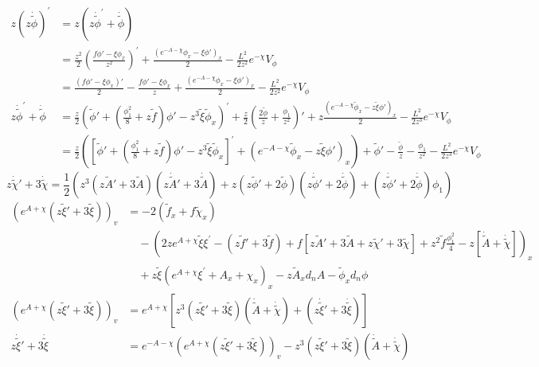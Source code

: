 \documentclass[12pt,a4paper]{ctexart}
\numberwithin{equation}{section}
\begin{document}
\begin{equation}
    \begin{aligned}
        z(z\dot{\tilde{\phi}})^{\prime}&=z(z\dot{\tilde{\phi}}^{\prime}+\dot{\tilde{\phi}})\\
        &=\frac{z^{2}}{2}(\frac{f\phi'-\xi\phi_{x}}{z^{2}})^{\prime}+\frac{(e^{-A-\chi}\phi_{x}-\xi\phi')_{x}}{2}-\frac{L^{2}}{2z^{2}}e^{-\chi}V_\phi\\
        &=\frac{(f\phi'-\xi\phi_{x})'}{2}-\frac{f\phi'-\xi\phi_{x}}{z}+\frac{(e^{-A-\chi}\phi_{x}-\xi\phi')_{x}}{2}-\frac{L^{2}}{2z^{2}}e^{-\chi}V_\phi\\
        z\dot{\tilde{\phi}}^{\prime}+\dot{\tilde{\phi}}&=\frac{z}{2}(\tilde{\phi}'+(\frac{\phi_1^2}{8}+z\tilde{f})\phi'-z^3\tilde{\xi}\tilde{\phi}_{x})^{\prime}+\frac{z}{2}(\frac{2\tilde{\phi}}{z}+\frac{\phi_1}{z^2})'+z\frac{(e^{-A-\chi}\tilde{\phi}_{x}-z\tilde{\xi}\phi')_{x}}{2}-\frac{L^{2}}{2z^{3}}e^{-\chi}V_\phi\\
        &=\frac{z}{2}([\tilde{\phi}'+(\frac{\phi_1^2}{8}+z\tilde{f})\phi'-z^3\tilde{\xi}\tilde{\phi}_{x}]^{\prime}+(e^{-A-\chi}\tilde{\phi}_{x}-z\tilde{\xi}\phi')_{x})+\tilde{\phi}'-\frac{\tilde{\phi}}{z}-\frac{\phi_1}{z^2}-\frac{L^{2}}{2z^{3}}e^{-\chi}V_\phi
    \end{aligned}
\end{equation}
\begin{equation}
    z\dot{\tilde{\chi}}'+3\dot{\tilde{\chi}}=\frac{1}{2}(z^3(z\tilde{A}'+3\tilde{A})(z\dot{\tilde{A}}'+3\dot{\tilde{A}})+z(z\tilde{\phi}'+2\tilde{\phi})(z\dot{\tilde{\phi}}'+2\dot{\tilde{\phi}})+(z\dot{\tilde{\phi}}'+2\dot{\tilde{\phi}})\phi_1)
\end{equation}
\begin{equation}
    \begin{aligned}
        (e^{A+\chi}(z\tilde{\xi}'+3\tilde{\xi}))_{v}&=-2(\tilde{f}_{x}+f\tilde{\chi}_{x})\\
        &\quad-(2ze^{A+\chi}\tilde{\xi}\xi^{\prime}-(z\tilde{f}'+3\tilde{f})+f[z\tilde{A}'+3\tilde{A}+z\tilde{\chi}'+3\tilde{\chi}]+z^2\tilde{f}\frac{\phi_1^2}{4}-z[\dot{\tilde{A}}+\dot{\tilde{\chi}}])_{x}\\
        &\quad+z\tilde{\xi}(e^{A+\chi}\xi^{\prime}+A_{x}+\chi_{x})_{x}-z\tilde{A}_{x}d_{n}A-\tilde{\phi}_{x}d_n\phi\\
        (e^{A+\chi}(z\tilde{\xi}'+3\tilde{\xi}))_{v}&=e^{A+\chi}[z^3(z\tilde{\xi}'+3\tilde{\xi})(\dot{\tilde{A}}+\dot{\tilde{\chi}})+(z\dot{\tilde{\xi}}'+3\dot{\tilde{\xi}})]\\
        z\dot{\tilde{\xi}}'+3\dot{\tilde{\xi}}&=e^{-A-\chi}(e^{A+\chi}(z\tilde{\xi}'+3\tilde{\xi}))_{v}-z^3(z\tilde{\xi}'+3\tilde{\xi})(\dot{\tilde{A}}+\dot{\tilde{\chi}})
    \end{aligned}
\end{equation}
\end{document}
